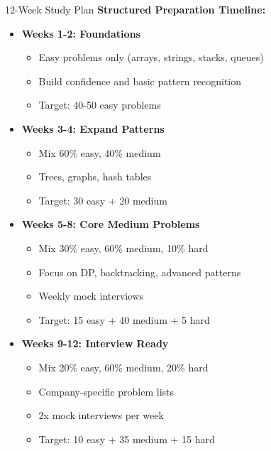 \documentclass[aspectratio=169,xcolor=dvipsnames]{beamer}
\begin{document}
\begin{frame}{12-Week Study Plan}
  \textbf{Structured Preparation Timeline:}

  \vspace{0.3cm}
  \begin{itemize}
    \item \textbf{Weeks 1-2: Foundations}
    \begin{itemize}
      \item Easy problems only (arrays, strings, stacks, queues)
      \item Build confidence and basic pattern recognition
      \item Target: 40-50 easy problems
    \end{itemize}

    \vspace{0.2cm}
    \item \textbf{Weeks 3-4: Expand Patterns}
    \begin{itemize}
      \item Mix 60\% easy, 40\% medium
      \item Trees, graphs, hash tables
      \item Target: 30 easy + 20 medium
    \end{itemize}

    \vspace{0.2cm}
    \item \textbf{Weeks 5-8: Core Medium Problems}
    \begin{itemize}
      \item Mix 30\% easy, 60\% medium, 10\% hard
      \item Focus on DP, backtracking, advanced patterns
      \item Weekly mock interviews
      \item Target: 15 easy + 40 medium + 5 hard
    \end{itemize}

    \vspace{0.2cm}
    \item \textbf{Weeks 9-12: Interview Ready}
    \begin{itemize}
      \item Mix 20\% easy, 60\% medium, 20\% hard
      \item Company-specific problem lists
      \item 2x mock interviews per week
      \item Target: 10 easy + 35 medium + 15 hard
    \end{itemize}
  \end{itemize}
\end{frame}
\end{document}
